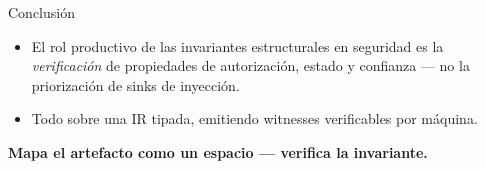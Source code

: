 \documentclass[aspectratio=169,11pt]{beamer}
\begin{document}
\begin{frame}{Conclusión}
  \begin{itemize}
    \item El rol productivo de las invariantes estructurales en seguridad es la
          \emph{verificación} de propiedades de autorización, estado y confianza ---
          no la priorización de sinks de inyección.
    \item Todo sobre una IR tipada, emitiendo witnesses verificables por máquina.
  \end{itemize}
  \vspace{2mm}
  \centering
  \Large\color{valen}\textbf{Mapa el artefacto como un espacio --- verifica la invariante.}
\end{frame}
\end{document}

